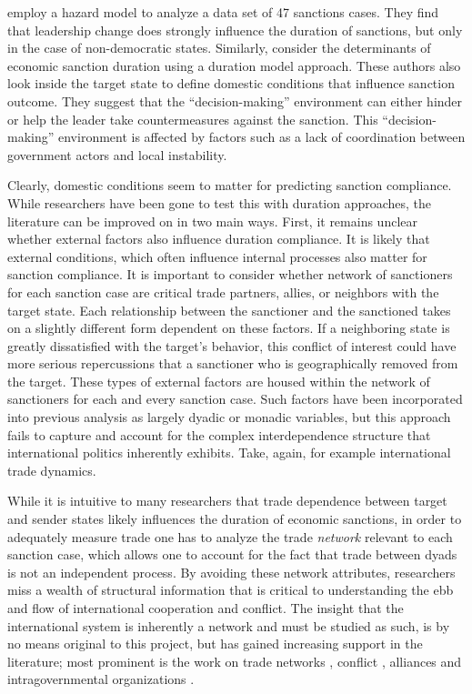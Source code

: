 \cite{mcgillivray2004} employ a hazard model to analyze a data set of 47 sanctions cases. They find that leadership change does strongly influence the duration of sanctions, but only in the case of non-democratic states. Similarly, \cite{bolks2000} consider the determinants of economic sanction duration using a duration model approach. These authors also look inside the target state to define domestic conditions that influence sanction outcome. They suggest that the ``decision-making'' environment can either hinder or help the leader take countermeasures against the sanction. This ``decision-making'' environment is affected by factors such as a lack of coordination between government actors and local instability. 

Clearly, domestic conditions seem to matter for predicting sanction compliance. While researchers have been gone to test this with duration approaches, the literature can be improved on in two main ways. First, it remains unclear whether external factors also influence duration compliance. It is likely that external conditions, which often influence internal processes also matter for sanction compliance. It is important to consider whether network of sanctioners for each sanction case are critical trade partners, allies, or neighbors with the target state. Each relationship between the sanctioner and the sanctioned takes on a slightly different form dependent on these factors. If a neighboring state is greatly dissatisfied with the target's behavior, this conflict of interest could have more serious repercussions that a sanctioner who is geographically removed from the target. These types of external factors are housed within the network of sanctioners for each and every sanction case. Such factors have been incorporated into previous analysis as largely dyadic or monadic variables, but this approach fails to capture and account for the complex interdependence structure that international politics inherently exhibits. Take, again, for example international trade dynamics. 

While it is intuitive to many researchers that trade dependence between target and sender states likely influences the duration of economic sanctions, in order to adequately measure trade one has to analyze the trade \textit{network} relevant to each sanction case, which allows one to account for the fact that trade between dyads is not an independent process. By avoiding these network attributes, researchers miss a wealth of structural information that is critical to understanding the ebb and flow of international cooperation and conflict. The insight that the international system is inherently a network and must be studied as such, is by no means original to this project, but has gained increasing support in the literature; most prominent is the work on trade networks \citep{hoff2004modeling} , conflict \citep{dorff2013}, alliances \citep{warren2010geometry} and intragovernmental organizations \citep{cao2009networks,greenhill2010norm}. 


